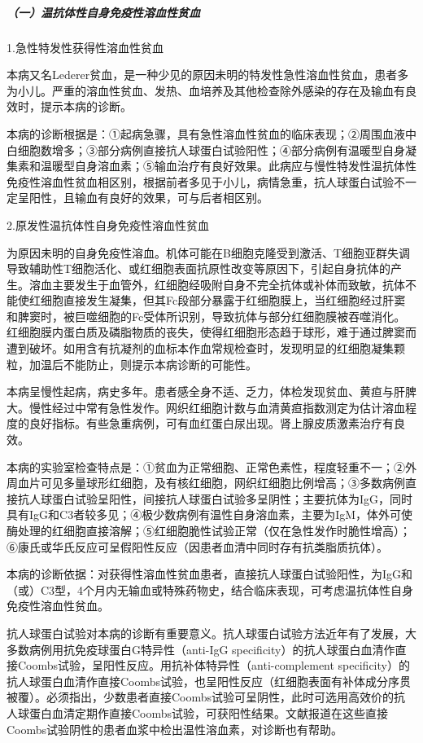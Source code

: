 \subparagraph{（一）温抗体性自身免疫性溶血性贫血}

\hypertarget{text00260.htmlux5cux23CHP33-5-4-1-1-1-1}{}
1.急性特发性获得性溶血性贫血

本病又名Lederer贫血，是一种少见的原因未明的特发性急性溶血性贫血，患者多为小儿。严重的溶血性贫血、发热、血培养及其他检查除外感染的存在及输血有良效时，提示本病的诊断。

本病的诊断根据是：①起病急骤，具有急性溶血性贫血的临床表现；②周围血液中白细胞数增多；③部分病例直接抗人球蛋白试验阳性；④部分病例有温暖型自身凝集素和温暖型自身溶血素；⑤输血治疗有良好效果。此病应与慢性特发性温抗体性免疫性溶血性贫血相区别，根据前者多见于小儿，病情急重，抗人球蛋白试验不一定呈阳性，且输血有良好的效果，可与后者相区别。

\hypertarget{text00260.htmlux5cux23CHP33-5-4-1-1-1-2}{}
2.原发性温抗体性自身免疫性溶血性贫血

为原因未明的自身免疫性溶血。机体可能在B细胞克隆受到激活、T细胞亚群失调导致辅助性T细胞活化、或红细胞表面抗原性改变等原因下，引起自身抗体的产生。溶血主要发生于血管外，红细胞经吸附自身不完全抗体或补体而致敏，抗体不能使红细胞直接发生凝集，但其Fc段部分暴露于红细胞膜上，当红细胞经过肝窦和脾窦时，被巨噬细胞的Fc受体所识别，导致抗体与部分红细胞膜被吞噬消化。红细胞膜内蛋白质及磷脂物质的丧失，使得红细胞形态趋于球形，难于通过脾窦而遭到破坏。如用含有抗凝剂的血标本作血常规检查时，发现明显的红细胞凝集颗粒，加温后不能防止，则提示本病诊断的可能性。

本病呈慢性起病，病史多年。患者感全身不适、乏力，体检发现贫血、黄疸与肝脾大。慢性经过中常有急性发作。网织红细胞计数与血清黄疸指数测定为估计溶血程度的良好指标。有些急重病例，可有血红蛋白尿出现。肾上腺皮质激素治疗有良效。

本病的实验室检查特点是：①贫血为正常细胞、正常色素性，程度轻重不一；②外周血片可见多量球形红细胞，及有核红细胞，网织红细胞比例增高；③多数病例直接抗人球蛋白试验呈阳性，间接抗人球蛋白试验多呈阴性；主要抗体为IgG，同时具有IgG和C3者较多见；④极少数病例有温性自身溶血素，主要为IgM，体外可使酶处理的红细胞直接溶解；⑤红细胞脆性试验正常（仅在急性发作时脆性增高）；⑥康氏或华氏反应可呈假阳性反应（因患者血清中同时存有抗类脂质抗体）。

本病的诊断依据：对获得性溶血性贫血患者，直接抗人球蛋白试验阳性，为IgG和（或）C3型，4个月内无输血或特殊药物史，结合临床表现，可考虑温抗体性自身免疫性溶血性贫血。

抗人球蛋白试验对本病的诊断有重要意义。抗人球蛋白试验方法近年有了发展，大多数病例用抗免疫球蛋白G特异性（anti-IgG
specificity）的抗人球蛋白血清作直接Coombs试验，呈阳性反应。用抗补体特异性（anti-complement
specificity）的抗人球蛋白血清作直接Coombs试验，也呈阳性反应（红细胞表面有补体成分序贯被覆）。必须指出，少数患者直接Coombs试验可呈阴性，此时可选用高效价的抗人球蛋白血清定期作直接Coombs试验，可获阳性结果。文献报道在这些直接Coombs试验阴性的患者血浆中检出温性溶血素，对诊断也有帮助。

